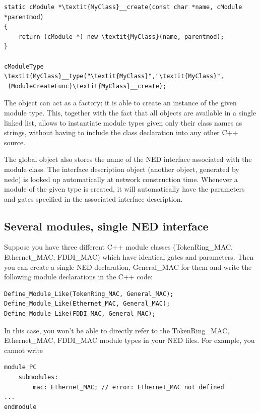 \begin{Verbatim}[commandchars=\\\{\}]
static cModule *\textit{MyClass}__create(const char *name, cModule *parentmod)
{ 
    return (cModule *) new \textit{MyClass}(name, parentmod);
}
  
cModuleType \textit{MyClass}__type("\textit{MyClass}","\textit{MyClass}", 
 (ModuleCreateFunc)\textit{MyClass}__create);
\end{Verbatim}


The  object can act as a factory: it is able to
create an instance of the given module type. This, together with the
fact that all  objects are available in a single
linked list, allows {\opp} to instantiate module types given only
their class names as strings, without having to include the class
declaration into any other C++ source.


The global object also stores the name of the NED
interface associated with the module class. The
interface description object
(another object, generated by nedc) is looked up automatically at
network construction time. Whenever a module of the given type is
created, it will automatically have the parameters and gates specified
in the associated interface description.





\subsection{Several modules, single NED interface}

Suppose you have three different C++ module classes (TokenRing\_MAC,
Ethernet\_MAC, FDDI\_MAC) which have identical gates and parameters.
Then you can create a single NED declaration, General\_MAC for them
and write the following module declarations in the C++ code:

\begin{Verbatim}
Define_Module_Like(TokenRing_MAC, General_MAC);
Define_Module_Like(Ethernet_MAC, General_MAC);
Define_Module_Like(FDDI_MAC, General_MAC);
\end{Verbatim}

In this case, you won't be able to directly refer to the
TokenRing\_MAC, Ethernet\_MAC, FDDI\_MAC module types in your NED
files. For example, you cannot write

\begin{Verbatim}
module PC 
    submodules:
        mac: Ethernet_MAC; // error: Ethernet_MAC not defined
...
endmodule
\end{Verbatim}


